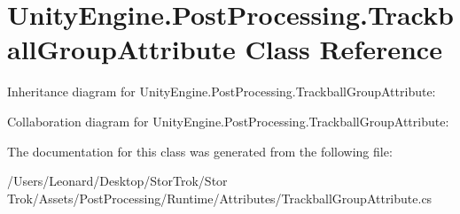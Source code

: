 \hypertarget{class_unity_engine_1_1_post_processing_1_1_trackball_group_attribute}{}\section{Unity\+Engine.\+Post\+Processing.\+Trackball\+Group\+Attribute Class Reference}
\label{class_unity_engine_1_1_post_processing_1_1_trackball_group_attribute}


Inheritance diagram for Unity\+Engine.\+Post\+Processing.\+Trackball\+Group\+Attribute\+:


Collaboration diagram for Unity\+Engine.\+Post\+Processing.\+Trackball\+Group\+Attribute\+:


The documentation for this class was generated from the following file\+:\begin{DoxyCompactItemize}
\item 
/\+Users/\+Leonard/\+Desktop/\+Stor\+Trok/\+Stor Trok/\+Assets/\+Post\+Processing/\+Runtime/\+Attributes/Trackball\+Group\+Attribute.\+cs\end{DoxyCompactItemize}

